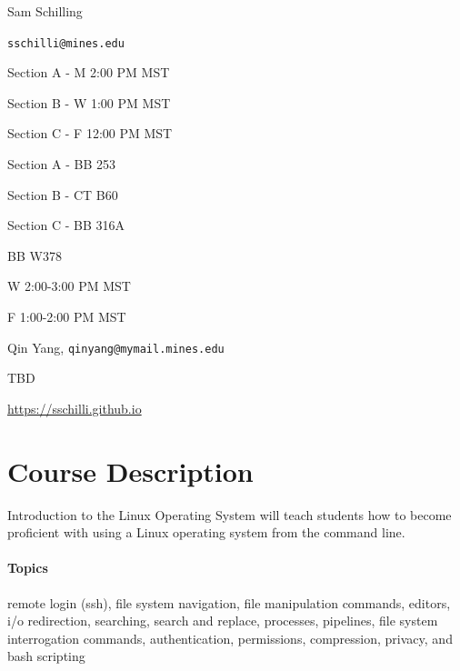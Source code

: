 \documentclass[12pt]{article}
\begin{document}
  \maketitle
\begin{description}
  \item[Instructor] Sam Schilling
  \item[Email] \texttt{sschilli@mines.edu}
  \item[Lecture Times]
  
  \item Section A - M 2:00  PM MST
  \item Section B - W 1:00  PM MST
  \item Section C - F 12:00 PM MST
  
  \item[Classrooms]
  
  \item Section A - BB 253
  \item Section B - CT B60
  \item Section C - BB 316A
  
  \item[Office Hours] BB W378 
  
  \item W 2:00-3:00 PM MST
  \item F 1:00-2:00 PM MST
  \item[TA] Qin Yang, \texttt{qinyang@mymail.mines.edu}
  \item[TA Office Hours] TBD
  \item[Course Webpage] \href{https://sschilli.github.io}{https://sschilli.github.io}
\end{description}
\section{Course Description}
Introduction to the Linux Operating System will teach students how to become proficient with using a Linux operating system from the command
line.

\paragraph{Topics} remote login (ssh), file system navigation, file manipulation commands, editors, i/o redirection, searching, search and replace,
processes, pipelines, file system interrogation commands, authentication, permissions, compression, privacy, and bash scripting
\end{document}
